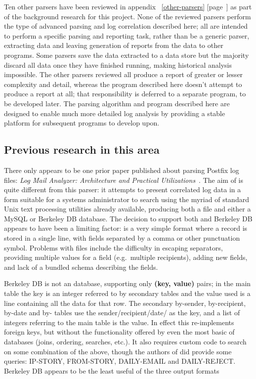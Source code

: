 \documentclass[a4paper,12pt,draft]{article}
\newcommand{\refwithpage}[1]{%
    \empty{}\ref{#1} [page~\pageref{#1}]%
}
\begin{document}
Ten other parsers have been reviewed in
appendix~\refwithpage{other-parsers} as part of the background research for
this project.  None of the reviewed parsers perform the type of advanced
parsing and log correlation described here; all are intended to perform a
specific parsing and reporting task, rather than be a generic parser,
extracting data and leaving generation of reports from the data to other
programs.  Some parsers save the data extracted to a data store but the
majority discard all data once they have finished running, making
historical analysis impossible.  The other parsers reviewed all produce a
report of greater or lesser complexity and detail, whereas the program
described here doesn't attempt to produce a report at all; that
responsibility is deferred to a separate program, to be developed later.
The parsing algorithm and program described here are designed to enable
much more detailed log analysis by providing a stable platform for
subsequent programs to develop upon.



\subsection{Previous research in this area}

\label{prior art}

There only appears to be one prior paper published about parsing Postfix
log files: \textit{Log Mail Analyzer: Architecture and Practical
Utilizations\/}~\cite{log-mail-analyser}.  The aim of \LMA{} is quite
different from this parser: it attempts to present correlated log data in a
form suitable for a systems administrator to search using the myriad of
standard Unix text processing utilities already available, producing both a
\CSV{} file and either a MySQL or Berkeley DB database.  The decision to
support both \CSV{} and Berkeley DB appears to have been a limiting factor:
\CSV{} is a very simple format where a record is stored in a single line,
with fields separated by a comma or other punctuation symbol.  Problems
with \CSV{} files include the difficulty in escaping separators, providing
multiple values for a field (e.g.\ multiple recipients), adding new fields,
and lack of a bundled schema describing the fields.

Berkeley DB is not an \SQL{} database, supporting only \textbf{(key,
value)} pairs; in the main table the key is an integer referred to by
secondary tables and the value used is a \CSV{} line containing all the
data for that row.  The secondary by-sender, by-recipient, by-date and
by-\IP{} tables use the sender/recipient/date/\IP{} as the key, and a
\CSV{} list of integers referring to the main table is the value.  In
effect this re-implements \SQL{} foreign keys, but without the
functionality offered by even the most basic of \SQL{} databases (joins,
ordering, searches, etc.).  It also requires custom code to search on some
combination of the above, though the authors of \LMA{} did provide some
queries: IP-STORY, FROM-STORY, DAILY-EMAIL and DAILY-REJECT\@.  Berkeley DB
appears to be the least useful of the three output formats
\end{document}
